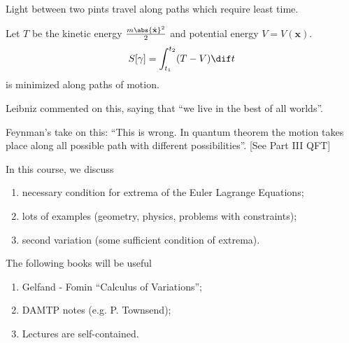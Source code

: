 \begin{example}
    Light between two pints travel along paths which require least time.
\end{example}

\begin{example}
    Let \(T\) be the kinetic energy \(\frac{m \abs{\dot{\mathbf{x}}}^2}{2}\) and potential energy \(V = V(\mathbf{x})\).
    \[
        S[\gamma] = \int_{t_1}^{t_2} (T - V) \dif t
    \]
    is minimized along paths of motion.

    Leibniz commented on this, saying that ``we live in the best of all worlds''.

    Feynman's take on this: ``This is wrong. In quantum theorem the motion takes place along all possible path with different possibilities''. [See Part III QFT]
\end{example}

In this course, we discuss
\begin{enumerate}
    \item necessary condition for extrema of the Euler Lagrange Equations;
    \item lots of examples (geometry, physics, problems with constraints);
    \item second variation (some sufficient condition of extrema).
\end{enumerate}
The following books will be useful
\begin{enumerate}
    \item Gelfand - Fomin ``Calculus of Variations'';
    \item DAMTP notes (e.g. P. Townsend);
    \item Lectures are self-contained.
\end{enumerate}